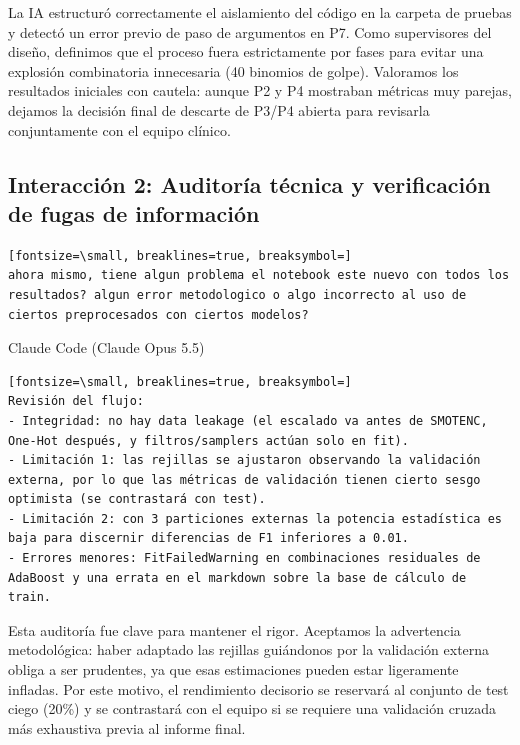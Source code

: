 \documentclass[12pt,a4paper,oneside]{book}
\begin{document}
\begin{iaanalisis}
La IA estructuró correctamente el aislamiento del código en la carpeta de pruebas y detectó un error previo de paso de argumentos en P7. Como supervisores del diseño, definimos que el proceso fuera estrictamente por fases para evitar una explosión combinatoria innecesaria (40 binomios de golpe). Valoramos los resultados iniciales con cautela: aunque P2 y P4 mostraban métricas muy parejas, dejamos la decisión final de descarte de P3/P4 abierta para revisarla conjuntamente con el equipo clínico.
\end{iaanalisis}

\subsection*{Interacción 2: Auditoría técnica y verificación de fugas de información}

\begin{iaprompt}
\begin{Verbatim}[fontsize=\small, breaklines=true, breaksymbol=]
ahora mismo, tiene algun problema el notebook este nuevo con todos los resultados? algun error metodologico o algo incorrecto al uso de ciertos preprocesados con ciertos modelos?
\end{Verbatim}
\end{iaprompt}
\begin{iaresp}{Claude Code (Claude Opus 5.5)}
\begin{Verbatim}[fontsize=\small, breaklines=true, breaksymbol=]
Revisión del flujo:
- Integridad: no hay data leakage (el escalado va antes de SMOTENC, One-Hot después, y filtros/samplers actúan solo en fit).
- Limitación 1: las rejillas se ajustaron observando la validación externa, por lo que las métricas de validación tienen cierto sesgo optimista (se contrastará con test).
- Limitación 2: con 3 particiones externas la potencia estadística es baja para discernir diferencias de F1 inferiores a 0.01.
- Errores menores: FitFailedWarning en combinaciones residuales de AdaBoost y una errata en el markdown sobre la base de cálculo de train.
\end{Verbatim}
\end{iaresp}
\begin{iaanalisis}
Esta auditoría fue clave para mantener el rigor. Aceptamos la advertencia metodológica: haber adaptado las rejillas guiándonos por la validación externa obliga a ser prudentes, ya que esas estimaciones pueden estar ligeramente infladas. Por este motivo, el rendimiento decisorio se reservará al conjunto de test ciego (20\%) y se contrastará con el equipo si se requiere una validación cruzada más exhaustiva previa al informe final.
\end{iaanalisis}
\end{document}
